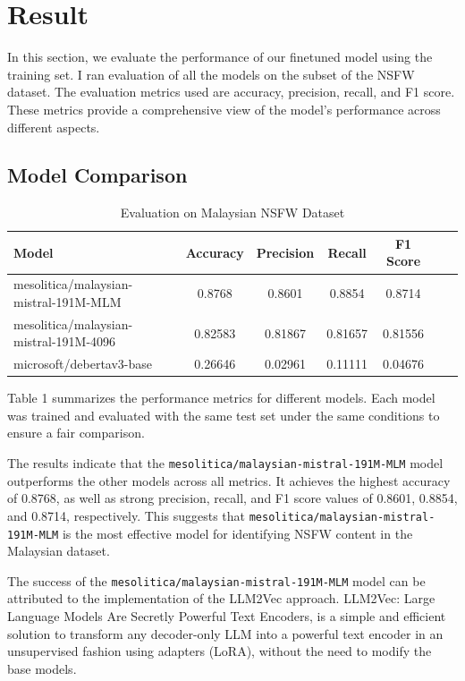 \documentclass[preprint]{article}
\begin{document}
\section{Result}

In this section, we evaluate the performance of our finetuned model using the training set. I ran evaluation of all the models on the subset of the NSFW dataset. The evaluation metrics used are accuracy, precision, recall, and F1 score. These metrics provide a comprehensive view of the model's performance across different aspects.

\subsection{Model Comparison}

\begin{table}[h]
\centering
\caption{Evaluation on Malaysian NSFW Dataset}
\label{tab:model_comparison}
\begin{tabular}{lcccccc}
\hline
\textbf{Model} & \textbf{Accuracy} & \textbf{Precision} & \textbf{Recall} & \textbf{F1 Score} \\
\hline
mesolitica/malaysian-mistral-191M-MLM & 0.8768 & 0.8601 & 0.8854 & 0.8714 \\
mesolitica/malaysian-mistral-191M-4096 & 0.82583 & 0.81867 & 0.81657 & 0.81556 \\
microsoft/debertav3-base & 0.26646 & 0.02961 & 0.11111 & 0.04676 \\
\hline
\end{tabular}
\end{table}

Table 1 summarizes the performance metrics for different models. Each model was trained and evaluated with the same test set under the same conditions to ensure a fair comparison.

The results indicate that the \texttt{mesolitica/malaysian-mistral-191M-MLM} model outperforms the other models across all metrics. It achieves the highest accuracy of 0.8768, as well as strong precision, recall, and F1 score values of 0.8601, 0.8854, and 0.8714, respectively. This suggests that \texttt{mesolitica/malaysian-mistral-191M-MLM} is the most effective model for identifying NSFW content in the Malaysian dataset.

The success of the \texttt{mesolitica/malaysian-mistral-191M-MLM} model can be attributed to the implementation of the LLM2Vec \cite{behnamghader2024llm2veclargelanguagemodels} approach. LLM2Vec: Large Language Models Are Secretly Powerful Text Encoders, is a simple and efficient solution to transform any decoder-only LLM into a powerful text encoder in an unsupervised fashion using adapters (LoRA), without the need to modify the base models.
\end{document}
